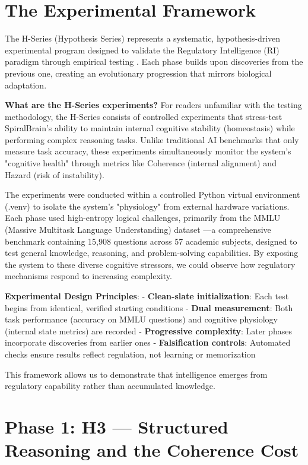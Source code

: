 \documentclass[12pt,a4paper]{report}
\begin{document}
\section{The Experimental Framework}

The H-Series (Hypothesis Series) represents a systematic, hypothesis-driven experimental program designed to validate the Regulatory Intelligence (RI) paradigm through empirical testing \cite{cragin2024regulatory}. Each phase builds upon discoveries from the previous one, creating an evolutionary progression that mirrors biological adaptation.

\textbf{What are the H-Series experiments?} For readers unfamiliar with the testing methodology, the H-Series consists of controlled experiments that stress-test SpiralBrain's ability to maintain internal cognitive stability (homeostasis) while performing complex reasoning tasks. Unlike traditional AI benchmarks that only measure task accuracy, these experiments simultaneously monitor the system's "cognitive health" through metrics like Coherence (internal alignment) and Hazard (risk of instability).

The experiments were conducted within a controlled Python virtual environment (.venv) to isolate the system's "physiology" from external hardware variations. Each phase used high-entropy logical challenges, primarily from the MMLU (Massive Multitask Language Understanding) dataset \cite{hendrycks2020measuring}—a comprehensive benchmark containing 15,908 questions across 57 academic subjects, designed to test general knowledge, reasoning, and problem-solving capabilities. By exposing the system to these diverse cognitive stressors, we could observe how regulatory mechanisms respond to increasing complexity.

\textbf{Experimental Design Principles}:
- \textbf{Clean-slate initialization}: Each test begins from identical, verified starting conditions
- \textbf{Dual measurement}: Both task performance (accuracy on MMLU questions) and cognitive physiology (internal state metrics) are recorded
- \textbf{Progressive complexity}: Later phases incorporate discoveries from earlier ones
- \textbf{Falsification controls}: Automated checks ensure results reflect regulation, not learning or memorization

This framework allows us to demonstrate that intelligence emerges from regulatory capability rather than accumulated knowledge.

\section{Phase 1: H3 — Structured Reasoning and the Coherence Cost}
\end{document}
